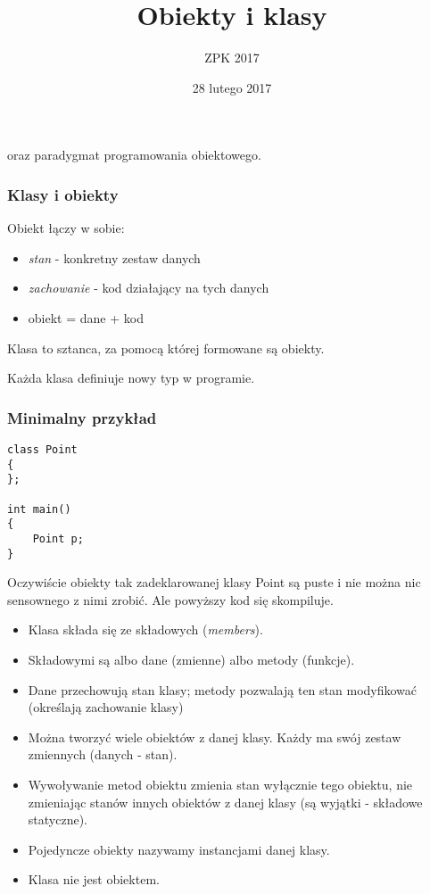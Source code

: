 \documentclass[pdftex, smaller]{beamer}
\author{ZPK 2017}
\title[Obiekty i klasy]
{Obiekty i klasy}
\date{28 lutego 2017}
\begin{document}
\begin{frame}
  \titlepage

  \begin{center}
    oraz paradygmat programowania obiektowego.
  \end{center}
\end{frame}

\begin{frame}
\frametitle{Klasy i obiekty}

Obiekt łączy w sobie:

\begin{itemize}
  \item \emph{stan} - konkretny zestaw danych
  \item \emph{zachowanie} - kod działający na tych danych
  \item obiekt = dane + kod
\end{itemize}

\vspace{8mm}
Klasa to sztanca, za pomocą której formowane są obiekty.

\vspace{8mm}
Każda klasa definiuje nowy typ w programie.
\end{frame}

\begin{frame}[fragile]
\frametitle{Minimalny przykład}

\begin{lstlisting}
class Point
{
};

int main()
{
    Point p;
}
\end{lstlisting}

Oczywiście obiekty tak zadeklarowanej klasy Point są puste i nie można nic sensownego z nimi zrobić. Ale powyższy kod się skompiluje.

\end{frame}

\begin{frame}

\begin{itemize}
\item Klasa składa się ze składowych (\emph{members}).
\item Składowymi są albo dane (zmienne) albo metody (funkcje).
\item Dane przechowują stan klasy; metody pozwalają ten stan modyfikować (określają zachowanie klasy)
\item Można tworzyć wiele obiektów z danej klasy. Każdy ma swój zestaw zmiennych (danych - stan).
\item Wywoływanie metod obiektu zmienia stan wyłącznie tego obiektu, nie zmieniając stanów innych obiektów z danej klasy (są wyjątki - składowe statyczne).
\item Pojedyncze obiekty nazywamy instancjami danej klasy.
\item Klasa nie jest obiektem.
\end{itemize}
\end{frame}
\end{document}
